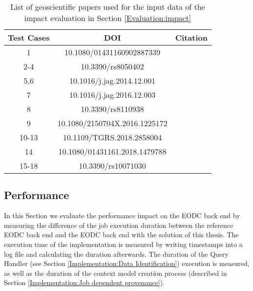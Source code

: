\documentclass[draft,final]{vutinfth} %
\begin{document}
\begin{table}[]
	\caption{List of geoscientific papers used for the input data of the impact evaluation in Section \ref{Evaluation:impact}}
	\centering
	\begin{tabular}{c|c|c}
		\textbf{Test Cases} & \textbf{DOI} & \textbf{Citation}  \\ \hline
		1 & 10.1080/01431160902887339 & \cite{evaluation1} \\ 
		2-4 & 10.3390/rs8050402 & \cite{evaluation2} \\ 
		5,6 & 10.1016/j.jag.2014.12.001  & \cite{evaluation3} \\
		7 & 10.1016/j.jag.2016.12.003  & \cite{evaluation4} \\
		8 & 10.3390/rs8110938  & \cite{evaluation5} \\
		9 & 10.1080/2150704X.2016.1225172  & \cite{evaluation6} \\
		10-13 & 10.1109/TGRS.2018.2858004  & \cite{evaluation7} \\
		14 & 10.1080/01431161.2018.1479788  & \cite{evaluation8} \\
		15-18 & 10.3390/rs10071030  & \cite{evaluation9} \\
	\end{tabular}
	\label{Tab:appendix}
\end{table}

\subsection{Performance}\label{Evaluation:impact_perf}

In this Section we evaluate the performance impact on the EODC back end by measuring the difference of the job execution duration between the reference EODC back end and the EODC back end with the solution of this thesis. The execution time of the implementation is measured by writing timestamps into a log file and calculating the duration afterwards. The duration of the Query Handler (see Section \ref{Implementation:Data Identification}) execution is measured, as well as the duration of the context model creation process (described in Section \ref{Implementation:Job dependent provenance}). 
\end{document}
